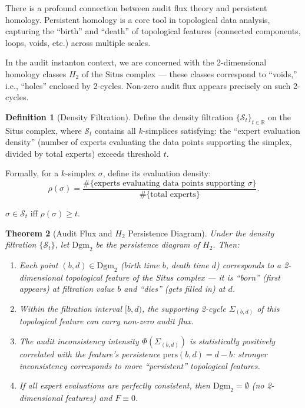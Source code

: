 \documentclass[12pt,a4paper]{article}
\theoremstyle{plain}
\newtheorem{theorem}{Theorem}
\theoremstyle{definition}
\newtheorem{definition}[theorem]{Definition}
\theoremstyle{remark}
\newcommand{\R}{\mathbb{R}}
\newcommand{\SSS}{\mathcal{S}}
\begin{document}
There is a profound connection between audit flux theory and persistent homology. Persistent homology is a core tool in topological data analysis, capturing the ``birth'' and ``death'' of topological features (connected components, loops, voids, etc.) across multiple scales.

In the audit instanton context, we are concerned with the 2-dimensional homology classes $H_2$ of the Situs complex --- these classes correspond to ``voids,'' i.e., ``holes'' enclosed by 2-cycles. Non-zero audit flux appears precisely on such 2-cycles.

\begin{definition}[Density Filtration]
\label{def:density_filtration}
Define the density filtration $\{\SSS_t\}_{t \in \R}$ on the Situs complex, where $\SSS_t$ contains all $k$-simplices satisfying: the ``expert evaluation density'' (number of experts evaluating the data points supporting the simplex, divided by total experts) exceeds threshold $t$.

Formally, for a $k$-simplex $\sigma$, define its evaluation density:
\begin{equation}\label{eq:eval_density}
    \rho(\sigma) = \frac{\#\{\text{experts evaluating data points supporting } \sigma\}}{\#\{\text{total experts}\}}.
\end{equation}

$\sigma \in \SSS_t$ iff $\rho(\sigma) \geq t$.
\end{definition}

\begin{theorem}[Audit Flux and $H_2$ Persistence Diagram]
\label{thm:persistent_H2}
Under the density filtration $\{\SSS_t\}$, let $\mathrm{Dgm}_2$ be the persistence diagram of $H_2$. Then:

\begin{enumerate}[label=(\roman*), leftmargin=*]
    \item Each point $(b, d) \in \mathrm{Dgm}_2$ (birth time $b$, death time $d$) corresponds to a 2-dimensional topological feature of the Situs complex --- it is ``born'' (first appears) at filtration value $b$ and ``dies'' (gets filled in) at $d$.
    \item Within the filtration interval $[b, d)$, the supporting 2-cycle $\Sigma_{(b,d)}$ of this topological feature can carry non-zero audit flux.
    \item The audit inconsistency intensity $\Phi(\Sigma_{(b,d)})$ is statistically positively correlated with the feature's persistence $\mathrm{pers}(b,d) = d - b$: stronger inconsistency corresponds to more ``persistent'' topological features.
    \item If all expert evaluations are perfectly consistent, then $\mathrm{Dgm}_2 = \emptyset$ (no 2-dimensional features) and $F \equiv 0$.
\end{enumerate}
\end{theorem}
\end{document}
